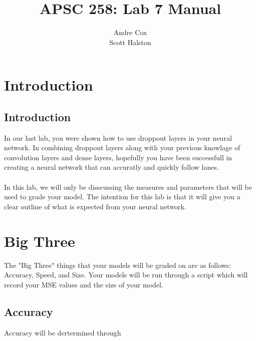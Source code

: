 \documentclass[11pt]{report}
\title{APSC 258: Lab 7 Manual}
\author{Andre Cox \\ Scott Halston}
\begin{document}
\maketitle
\tableofcontents

\clearpage

\chapter{Introduction}
\section{Introduction}
In our last lab, you were shown how to use droppout layers in your neural network. In combining droppout layers along with your previous knowlage of convolution layers and dense layers, hopefully you have been successfull in creating a neural network that can accuratly and quickly follow lanes.
\\ \\
In this lab, we will only be disscussing the measures and parameters that will be used to grade your model. The intention for this lab is that it will give you a clear outline of what is expected from your neural network.

\chapter{Big Three}
The "Big Three" things that your models will be graded on are as follows:
    Accuracy, Speed, and Size.
Your models will be run through a script which will record your MSE values and the size of your model.

\section{Accuracy}
Accuracy will be dertermined through 
\end{document}
